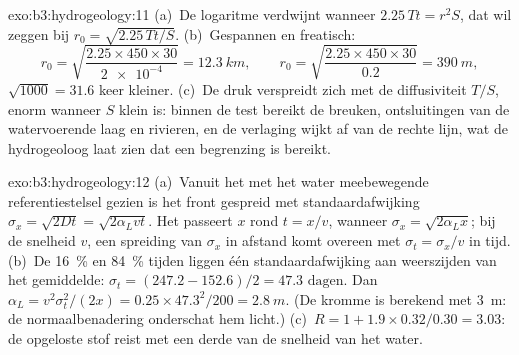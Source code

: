 \begin{solution}{exo:b3:hydrogeology:11}
(a)~De logaritme verdwijnt wanneer $2.25\,Tt = r^2S$, dat wil zeggen bij $r_0 =
\sqrt{2.25\,Tt/S}$. (b)~Gespannen en freatisch:
\[
r_0 = \sqrt{\frac{2.25\times450\times30}{\num{2e-4}}} = \qty{12.3}{km},
\qquad r_0 = \sqrt{\frac{2.25\times450\times30}{0.2}} = \qty{390}{m},
\]
$\sqrt{1000} = 31.6$ keer kleiner. (c)~De druk
verspreidt zich met de diffusiviteit $T/S$, enorm wanneer $S$ klein is: binnen
de test bereikt de  breuken, ontsluitingen van de watervoerende laag en rivieren,
en de verlaging wijkt af van de rechte lijn, wat de
hydrogeoloog laat zien dat een begrenzing is bereikt.
\end{solution}

\begin{solution}{exo:b3:hydrogeology:12}
(a)~Vanuit het met het water meebewegende referentiestelsel gezien is het front gespreid met
standaardafwijking $\sigma_x = \sqrt{2Dt} = \sqrt{2\alpha_Lvt}$. Het passeert
$x$ rond $t = x/v$, wanneer $\sigma_x = \sqrt{2\alpha_Lx}$; bij de snelheid
$v$, een spreiding van $\sigma_x$ in afstand komt overeen met $\sigma_t = \sigma_x/v$
in tijd. (b)~De \qty{16}{\percent} en \qty{84}{\percent} tijden liggen één
standaardafwijking aan weerszijden van het gemiddelde: $\sigma_t = (247.2 -
152.6)/2 = \num{47.3}\text{ dagen}$. Dan $\alpha_L = v^2\sigma_t^2/(2x) =
0.25\times47.3^2/200 = \qty{2.8}{m}$. (De kromme is berekend met
\qty{3}{m}: de normaalbenadering onderschat hem licht.) (c)~$R =
1 + 1.9\times0.32/0.30 = \num{3.03}$: de opgeloste stof reist met een derde van de
snelheid van het water.
\end{solution}

